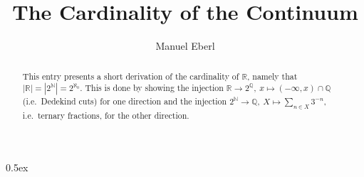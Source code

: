 \documentclass[11pt,a4paper]{article}
\begin{document}
\title{The Cardinality of the Continuum}
\author{Manuel Eberl}
\maketitle

\begin{abstract}
This entry presents a short derivation of the cardinality of $\mathbb{R}$,
namely that $|\mathbb{R}| = |2^{\mathbb{N}}| = 2^{\aleph_0}$. This is done by showing the
injection $\mathbb{R}\to 2^{\mathbb{Q}},\ x \mapsto (-\infty, x)\cap\mathbb{Q}$ (i.e.\ Dedekind cuts)
for one direction and the injection $2^\mathbb{N}\to\mathbb{Q},\ X \mapsto \sum_{n\in X} 3^{-n}$,
i.e.\ ternary fractions, for the other direction.
\end{abstract}


\tableofcontents

\newpage
\parindent 0pt\parskip 0.5ex


\end{document}
